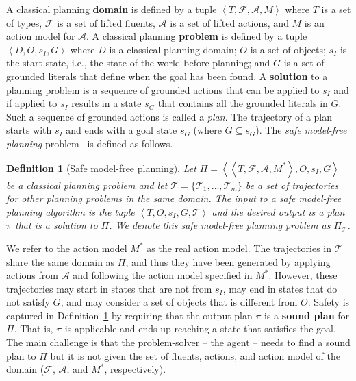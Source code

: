 \documentclass{article}
\newtheorem{definition}{Definition}
\newcommand{\tuple}[1]{\ensuremath{\left \langle #1 \right \rangle }}
\newcommand{\realm}{\ensuremath{M^*}\xspace}
\begin{document}
A classical planning \textbf{domain} is defined by a tuple 
$\tuple{T, \mathcal{F}, \mathcal{A}, M}$
where $T$ is a set of types, 
$\mathcal{F}$ is a set of lifted fluents, 
$\mathcal{A}$ is a set of lifted actions, 
and $M$ is an action model for $\mathcal{A}$.
A classical planning \textbf{problem} is defined by a tuple $\tuple{D, O,  s_I, G}$ where $D$ is a classical planning domain;  
$O$ is a set of objects; 
$s_I$ is the start state, i.e., the state of the world before planning;  
and $G$ is a set of grounded literals that define when the goal has been found. 
A \textbf{solution} to a planning problem is a sequence of grounded actions that can be applied to $s_I$ and if applied to $s_I$ results in a state $s_G$ that contains all the grounded literals in $G$. 
Such a sequence of grounded actions is called a \emph{plan}. 
The trajectory of a plan starts with $s_I$ and ends with a goal state $s_G$ (where $G\subseteq s_G$). 
The \emph{safe model-free planning} problem~\cite{stern2017efficientAndSafe} is defined as follows. 
\begin{definition}[Safe model-free planning]
Let $\Pi=\tuple{\tuple{T, \mathcal{F}, \mathcal{A}, \realm}, O, s_I, G}$ be a classical planning problem and let $\mathcal{T}=\{\mathcal{T}_1,\ldots, \mathcal{T}_m\}$ be a set of trajectories %
for other planning problems in the same domain. 
The input to a safe model-free planning algorithm is the tuple $\tuple{T,O, s_I, G, \mathcal{T}}$ and the desired output is a plan $\pi$ that is a solution to $\Pi$. We denote this safe model-free planning problem as $\Pi_{\mathcal{T}}$. 
\label{def:safe-model-free-planning}
\end{definition}
We refer to the action model $\realm$ as the real action model. 
The trajectories in $\mathcal{T}$ share the same domain as $\Pi$, 
and thus they have been generated by applying actions from $\mathcal{A}$ 
and following the action model specified in $\realm$. 
However, these trajectories may start in states that are not from $s_I$, 
may end in states that do not satisfy $G$, 
and may consider a set of objects that is different from $O$.  
Safety is captured in Definition~\ref{def:safe-model-free-planning} by requiring that the output plan $\pi$ is a \textbf{sound plan} for $\Pi$. That is, $\pi$ is applicable and ends up reaching a state that satisfies the goal.  
The main challenge is that the problem-solver -- the agent -- needs to find a sound plan to $\Pi$ but it is not given the set of fluents, actions, and action model of the domain ($\mathcal{F}$, $\mathcal{A}$, and \realm, respectively). 
\end{document}
